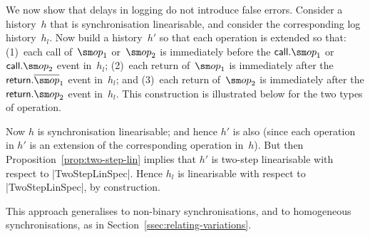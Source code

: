 We now show that delays in logging do not introduce false errors.  Consider a
history~$h$ that is synchronisation linearisable, and consider the
corresponding log history~$h_l$.  Now build a history~$h'$ so that each
operation is extended so that: (1)~each call of~$\op_1$ or~$\op_2$ is
immediately before the $\call.\op_1$ or $\call.\op_2$ event in~$h_l$; (2)~each
return of~$\op_1$ is immediately after the $\return.\overline\op_1$ event
in~$h_l$; and (3)~each return of~$\op_2$ is immediately after the
$\return.\op_2$ event in~$h_l$.  This construction is illustrated below for
the two types of operation.
%
\begin{center}
\end{center}
%
Now $h$ is synchronisation linearisable; and hence $h'$ is also (since each
operation in $h'$ is an extension of the corresponding operation in~$h$).  But
then Proposition~\ref{prop:two-step-lin} implies that $h'$ is two-step
linearisable with respect to |TwoStepLinSpec|.  Hence $h_l$ is linearisable
with respect to |TwoStepLinSpec|, by construction.

This approach generalises to non-binary synchronisations, and to homogeneous
synchronisations, as in Section~\ref{ssec:relating-variations}.

